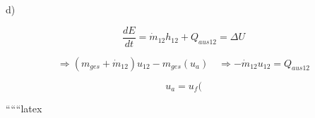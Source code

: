 d)

\[
\frac{dE}{dt} = \dot{m}_{12} h_{12} + Q_{aus12} = \Delta U
\]

\[
\Rightarrow (m_{ges} + \dot{m}_{12}) u_{12} - m_{ges}(u_a) \quad \Rightarrow - \dot{m}_{12} u_{12} = Q_{aus12}
\]

\[
u_a = u_f(
\]

``````latex